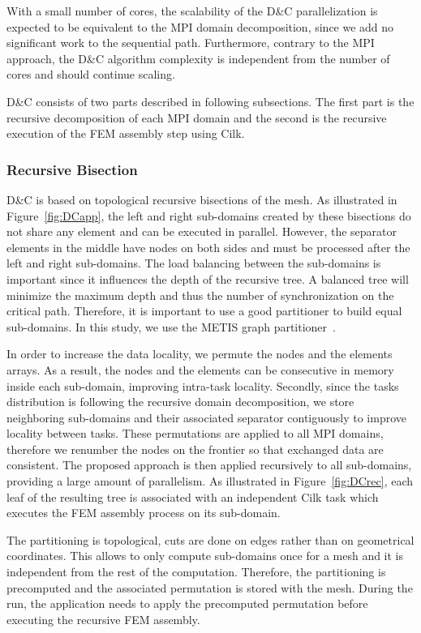 \documentclass[10pt]{IOS-Book-Article}
\begin{document}
With a small number of cores, the scalability of the D\&C parallelization is expected to be equivalent to the MPI domain decomposition, since we add no significant work to the sequential path.
Furthermore, contrary to the MPI approach, the D\&C algorithm complexity is independent from the number of cores and should continue scaling.


D\&C consists of two parts described in following subsections.
The first part is the recursive decomposition of each MPI domain and the second is the recursive execution of the FEM assembly step using Cilk.

\subsubsection{Recursive Bisection}
\label{sec:DCrec}
D\&C is based on topological recursive bisections of the mesh.
As illustrated in Figure~\ref{fig:DCapp}, the left and right sub-domains created by these bisections do not share any element and can be executed in parallel.
However, the separator elements in the middle have nodes on both sides and must be processed after the left and right sub-domains.
The load balancing between the sub-domains is important since it influences the depth of the recursive tree.
A balanced tree will minimize the maximum depth and thus the number of synchronization on the critical path.
Therefore, it is important to use a good partitioner to build equal sub-domains.
In this study, we use the METIS graph partitioner~\cite{Metis}.

In order to increase the data locality, we permute the nodes and the elements arrays.
As a result, the nodes and the elements can be consecutive in memory inside each sub-domain, improving intra-task locality.
Secondly, since the tasks distribution is following the recursive domain decomposition, we store neighboring sub-domains and their associated separator contiguously to improve locality between tasks.
These permutations are applied to all MPI domains, therefore we renumber the nodes on the frontier so that exchanged data are consistent.
The proposed approach is then applied recursively to all sub-domains, providing a large amount of parallelism.
As illustrated in Figure~\ref{fig:DCrec}, each leaf of the resulting tree is associated with an independent Cilk task which executes the FEM assembly process on its sub-domain.

The partitioning is topological, cuts are done on edges rather than on geometrical coordinates.
This allows to only compute sub-domains once for a mesh and it is independent from the rest of the computation.
Therefore, the partitioning is precomputed and the associated permutation is stored with the mesh.
During the run, the application needs to apply the precomputed permutation before executing the recursive FEM assembly.
\end{document}
